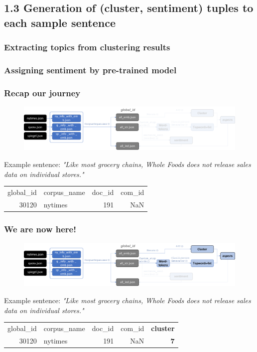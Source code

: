 \documentclass{tum-presentation}
\begin{document}
\subsection{1.3 Generation of (cluster, sentiment) tuples to each sample sentence}
\subsubsection{Extracting topics from clustering results}
\subsubsection{Assigning sentiment by pre-trained model}
\begin{frame}
  \frametitle{Recap our journey}
 
  \begin{figure}[t]
    \includegraphics[width = \textwidth]{figures/journey0.pdf}
    \end{figure}

Example sentence: \textit{"Like most grocery chains, Whole Foods does not release sales data on individual stores."}
\\[2ex]
\begin{tabular}{|r|l|r|r|}
      global\_id & corpus\_name &  doc\_id &  com\_id  \\
     
      30120 &     nytimes &     191 &     NaN  \\
      \end{tabular}
\end{frame}

\begin{frame}
  \frametitle{We are now here!}
    
  \begin{figure}[t]
    \includegraphics[width = \textwidth]{figures/journey1.pdf}
    \end{figure}

Example sentence: \textit{"Like most grocery chains, Whole Foods does not release sales data on individual stores."}
\\[2ex]
\begin{tabular}{|r|l|r|r|r|}
      global\_id & corpus\_name &  doc\_id &  com\_id  &  \textbf{cluster} \\
     
      30120 &     nytimes &     191 &     NaN &        \textbf{7} \\
      \end{tabular}
\end{frame}
\end{document}

